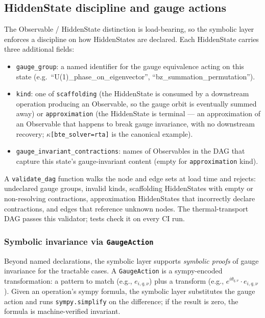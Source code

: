\documentclass[11pt,a4paper]{article}
\begin{document}
\subsection{HiddenState discipline and gauge actions}
\label{ssec:gauge-discipline}

The Observable / HiddenState distinction is load-bearing, so the symbolic layer
enforces a discipline on how HiddenStates are declared. Each HiddenState
carries three additional fields:

\begin{itemize}[leftmargin=2em, itemsep=0.2em]
  \item \texttt{gauge\_group}: a named identifier for the gauge equivalence
        acting on this state (e.g.\ ``U(1)\_phase\_on\_eigenvector'',
        ``bz\_summation\_permutation'').
  \item \texttt{kind}: one of \texttt{scaffolding} (the HiddenState is
        consumed by a downstream operation producing an Observable, so the
        gauge orbit is eventually summed away) or \texttt{approximation}
        (the HiddenState is terminal --- an approximation of an Observable
        that happens to break gauge invariance, with no downstream recovery;
        $\kappa$\texttt{[bte\_solver=rta]} is the canonical example).
  \item \texttt{gauge\_invariant\_contractions}: names of Observables in the
        DAG that capture this state's gauge-invariant content (empty for
        \texttt{approximation} kind).
\end{itemize}

A \texttt{validate\_dag} function walks the node and edge sets at
load time and rejects: undeclared gauge groups, invalid kinds, scaffolding
HiddenStates with empty or non-resolving contractions, approximation
HiddenStates that incorrectly declare contractions, and edges that
reference unknown nodes. The thermal-transport DAG passes this
validator; tests check it on every CI run.

\subsubsection*{Symbolic invariance via \texttt{GaugeAction}}

Beyond named declarations, the symbolic layer supports \emph{symbolic proofs}
of gauge invariance for the tractable cases. A \texttt{GaugeAction} is a
sympy-encoded transformation: a pattern to match (e.g., $e_{i, q, \nu}$)
plus a transform (e.g., $e^{i\theta_{q,\nu}} \cdot e_{i, q, \nu}$). Given
an operation's sympy formula, the symbolic layer substitutes the gauge action
and runs \texttt{sympy.simplify} on the difference; if the result is zero,
the formula is machine-verified invariant.
\end{document}
